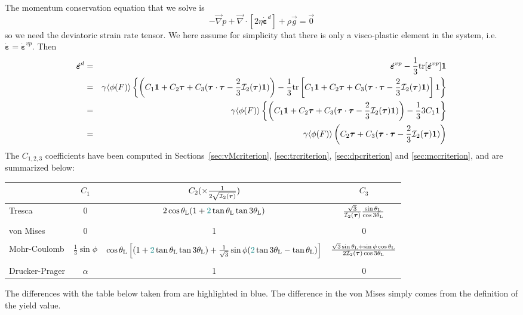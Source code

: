 The momentum conservation equation that we solve is 
\[
-\vec\nabla p + \vec\nabla \cdot \left[
2 \eta \dot{\bm\varepsilon}^d 
\right]+ \rho \vec g = \vec 0
\]
so we need the deviatoric strain rate tensor. 
We here assume for simplicity that there is only a visco-plastic element in the system, 
i.e. $\dot{\bm\varepsilon}=\dot{\bm\varepsilon}^{vp}$.
Then 
\begin{eqnarray}
\dot{\bm\varepsilon}^d 
&=& \dot{\bm\varepsilon}^{vp} - \frac13 {\rm tr}[ \dot{\bm\varepsilon}^{vp}] {\bm 1} \nonumber\\
&=& \gamma \langle \phi(F) \rangle 
\left\{
\left(C_1 \bm 1 + C_2 \bm\tau + C_3 (\bm\tau\cdot\bm\tau-\frac23 {\cal I}_2(\bm\tau)\bm 1)\right)
-\frac13
{\rm tr}
\left[C_1 \bm 1 + C_2 \bm\tau + C_3 (\bm\tau\cdot\bm\tau-\frac23 {\cal I}_2(\bm\tau)\bm 1)\right]
\bm 1
\right\} \nonumber\\
&=& \gamma \langle \phi(F) \rangle 
\left\{
\left(C_1 \bm 1 + C_2 \bm\tau + C_3 (\bm\tau\cdot\bm\tau-\frac23 {\cal I}_2(\bm\tau)\bm 1)\right)
-\frac13 3C_1
\bm 1
\right\} \nonumber\\
&=& \gamma \langle \phi(F) \rangle 
\left(C_2 \bm\tau + C_3 (\bm\tau\cdot\bm\tau-\frac23 {\cal I}_2(\bm\tau)\bm 1)\right)
\end{eqnarray}
The $C_{1,2,3}$ coefficients have been computed in 
Sections~\ref{sec:vMcriterion}, \ref{sec:trcriterion}, \ref{sec:dpcriterion} and 
\ref{sec:mccriterion}, and are summarized below: 

\begin{center}
\begin{footnotesize}
\begin{tabular}{lccc}
\hline
& $C_1$ & $C_2(\times \frac{1}{2 \sqrt{{\cal I}_2({\bm \tau})}})$ & $C_3$ \\
              \hline\hline
Tresca         &0 & $2 \cos\theta_{\rm L} ( 1 + {\color{teal}2} \tan\theta_{\rm L}  \tan 3\theta_{\rm L})$ &
$\frac{\sqrt{3}}{{\cal I}_2({\bm \tau}) } \frac{\sin\theta_{\rm L} }{\cos 3\theta_{\rm L}}$
\\ \\
von Mises      &0& {\color{teal}1}& 0 \\ \\ 
Mohr-Coulomb   & $\frac13 \sin\phi$ & 
$
\cos \theta_{\rm L} \left[
(1 +  {\color{teal}2}\tan \theta_{\rm L}   \tan 3\theta_{\rm L})
+\frac{1}{\sqrt{3}} \sin\phi
( {\color{teal}2}\tan 3\theta_{\rm L} - \tan\theta_{\rm L}) \right]$
&
$\frac{\sqrt{3}\sin\theta_{\rm L} +  \sin \phi \cos \theta_{\rm L}}
{2 {\cal I}_2({\bm \tau}) \cos 3\theta_{\rm L}}$ 
\\ \\
Drucker-Prager & $\alpha$ & 1 & 0 \\  
\hline
\end{tabular}
\end{footnotesize}
\end{center}
The differences with the table below  taken from \textcite{owhi} are highlighted in blue.
The difference in the von Mises simply comes from the definition of the 
yield value.

